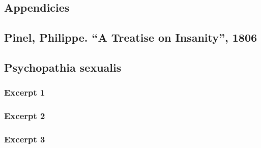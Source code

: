 \begin{refsection}
\pagebreak 

 \renewcommand*{\thechapter}{}
\renewcommand*{\thesection}{\Alph{section}}
\setcounter{chapter}{0}
\renewcommand*{\thesubsection}{\arabic{subsection}}



\chapter{Appendicies}
\label{appendicies}

\begin{appendices}
\let\svaddcontentsline\addcontentsline
\renewcommand\addcontentsline[3]{%
  \ifthenelse{\equal{#1}{lof}}{}%
  {\ifthenelse{\equal{#1}{lot}}{}{\svaddcontentsline{#1}{#2}{#3}}}}





\section{Pinel, Philippe. ``A Treatise on Insanity'', 1806}
\label{pinelphilippe.atreatiseoninsanity1806}

\label{app: Pinel}


\section{Psychopathia sexualis}
\label{psychopathiasexualis}

\subsection{Excerpt 1}
\label{excerpt1}

\label{app: KraftEbbing1}


\subsection{Excerpt 2}
\label{excerpt2}

\label{app: KraftEbbing2}


\subsection{Excerpt 3}
\label{excerpt3}


\end{appendices}
\end{refsection}
